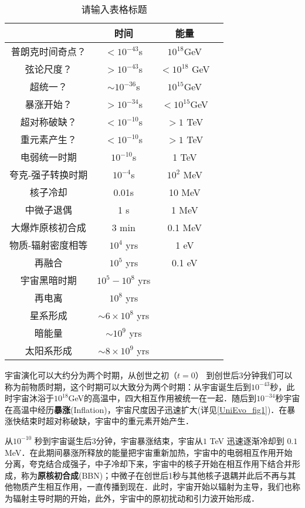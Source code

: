 
\begin{table}[ht]
\centering
\caption{请输入表格标题}\label{UniEvo_tab1}
\begin{tabular}{|c|c|c|c}
 & 时间 & 能量 \\
\hline
\hline
普朗克时间奇点？ & $<10^{-43}$s & $10^{18}${\rm GeV} \\
弦论尺度？       & $>10^{-43}$s & $<10^{18}$ GeV \\
超统一？         & $\sim 10^{-36}$s & $10^{15}$GeV \\
暴涨开始？       & $>10^{-34}$s & $<10^{15} $GeV \\
超对称破缺？     & $<10^{-10}$s & $>1$ TeV \\
重元素产生？     & $<10^{-10}$s & $>1$ TeV \\
\hline
\hline
电弱统一时期    & $10^{-10}$s & 1 TeV \\
夸克-强子转换时期 & $10^{-4}$s & $10^2$ MeV \\
核子冷却        & 0.01s & 10 MeV \\
中微子退偶      & 1 s  & 1 MeV \\
大爆炸原核初合成  & 3 min & 0.1 MeV \\
\hline
\hline
物质-辐射密度相等 & $10^4$ yrs  & 1 eV \\
再融合 & $10^5$ yrs  & 0.1 eV \\
宇宙黑暗时期 & $10^5 - 10^8$ yrs  &  \\
再电离 & $10^8$ yrs  &  \\
星系形成 & $\sim 6 \times 10^8$ yrs  &  \\
暗能量 & $ \sim10^9$  yrs  &  \\
太阳系形成 & $ \sim 8 \times 10^9  $ yrs  &  \\
\hline
\end{tabular}
\end{table}
宇宙演化可以大约分为两个时期，从创世之初（$t=0$） 到创世后3分钟我们可以称为前物质时期，这个时期可以大致分为两个时期：从宇宙诞生后到$10^{-43}$秒，此时宇宙沐浴于$10^{18}$GeV的高温中，四大相互作用被统一在一起．随后到$10^{-34}$秒宇宙在高温中经历\textbf{暴涨}(Inflation)，宇宙尺度因子迅速扩大(详见\autoref{UniEvo_fig1})．在暴涨快结束时超对称破缺，宇宙中的重元素开始产生．


从$10^{-10}$ 秒到宇宙诞生后3分钟，宇宙暴涨结束，宇宙从$1$ TeV 迅速逐渐冷却到 $0.1 $ MeV．在此期间暴涨所释放的能量把宇宙重新加热，宇宙中的电弱相互作用开始分离，夸克结合成强子，中子冷却下来，宇宙中的核子开始在相互作用下结合并形成，称为\textbf{原核初合成}(BBN)；中微子在创世后1秒与其他核子退耦并此后不再与其他物质产生相互作用，一直传播到现在．此时，宇宙开始以辐射为主导，我们也称为辐射主导时期的开始，此外，宇宙中的原初扰动和引力波开始形成．

